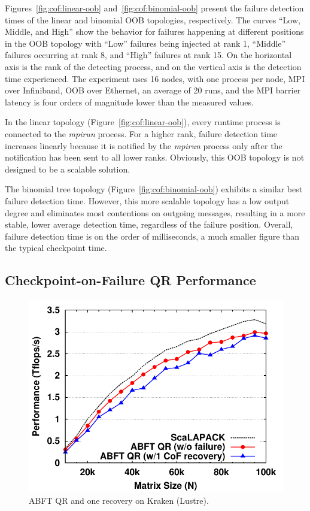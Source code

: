 Figures~\ref{fig:cof:linear-oob} and~\ref{fig:cof:binomial-oob} present the
failure detection times of the linear and binomial OOB topologies, respectively.
The curves ``Low, Middle, and High'' show the behavior for failures happening at
different positions in the OOB topology with ``Low'' failures being injected at 
rank 1, ``Middle'' failures occurring at rank 8, and ``High'' failures at rank 
15. On the horizontal axis is the rank of
the detecting process, and on the vertical axis is the detection time
experienced. The experiment uses 16 nodes, with one process per node, MPI over
Infiniband, OOB over Ethernet, an average of 20 runs, and the MPI barrier
latency is four orders of magnitude lower than the measured values.

In the linear topology (Figure~\ref{fig:cof:linear-oob}), every runtime process
is connected to the \emph{mpirun} process. For a higher rank, failure detection
time increases linearly because it is notified by the \emph{mpirun} process only
after the notification has been sent to all lower ranks. Obviously, this OOB 
topology is not designed to be a scalable solution. 

The binomial tree topology
(Figure~\ref{fig:cof:binomial-oob}) exhibits a similar best failure detection
time. However, this more scalable topology has a low output degree and
eliminates most contentions on outgoing messages, resulting in a more stable,
lower average detection time, regardless of the failure position. Overall,
failure detection time is on the order of milliseconds, a much smaller figure
than the typical checkpoint time.

\subsection{Checkpoint-on-Failure QR Performance}
\label{subsect:cof:performance:qr}

\begin{figure}[t]
    \centering
    \includegraphics[width=.8\linewidth]{figures/kraken-new-data}
    \caption{ABFT QR and one \cof recovery on Kraken (Lustre).}%
    \label{fig:cof:kraken-performance}	
\end{figure}

